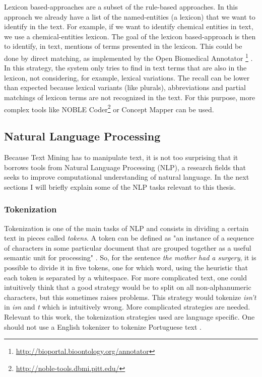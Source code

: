 Lexicon based-approaches are a subset of the rule-based approaches. In this approach we already have a list of the named-entities (a lexicon) that we want to identify in the text. For example, if we want to identify chemical entities in text, we use a chemical-entities lexicon. The goal of the lexicon based-approach is then to identify, in text, mentions of terms presented in the lexicon. This could be done by direct matching, as implemented by the Open Biomedical Annotator \footnote{\url{http://bioportal.bioontology.org/annotator}} \citep{Jonquet2009}. In this strategy, the system only tries to find in text terms that are also in the lexicon, not considering, for example, lexical variations. The recall can be lower than expected because lexical variants (like plurals), abbreviations and partial matchings of lexicon terms are not recognized in the text. For this purpose, more complex tools like NOBLE Coder\footnote{\url{http://noble-tools.dbmi.pitt.edu/}} \citep{Tseytlin2016} or Concept Mapper \citep{Stewart} can be used.

\subsection{Natural Language Processing}

Because Text Mining has to manipulate text, it is not too surprising that it borrows tools from Natural Language Processing (NLP), a research fields that seeks to improve computational understanding of natural language. In the next sections I will briefly explain some of the NLP tasks relevant to this thesis.

\subsubsection{Tokenization}

Tokenization is one of the main tasks of NLP and consists in dividing a certain text in pieces called \textit{tokens}. A token can be defined as "an instance
of a sequence of characters in some particular document that are grouped
together as a useful semantic unit for processing" \citep{Manning2009a}. So, for the sentence \textit{the mother had a surgery}, it is possible to divide it in five tokens, one for which word, using the heuristic that each token is separated by a whitespace. For more complicated text, one could intuitively think that a good strategy would be to split on all non-alphanumeric characters, but this sometimes raises problems. This strategy would tokenize \textit{isn't} in \textit{isn} and \textit{t} which is intuitively wrong. More complicated strategies are needed. Relevant to this work, the tokenization strategies used are language specific. One should not use a English tokenizer to tokenize Portuguese text \citep{Branco2003}.

